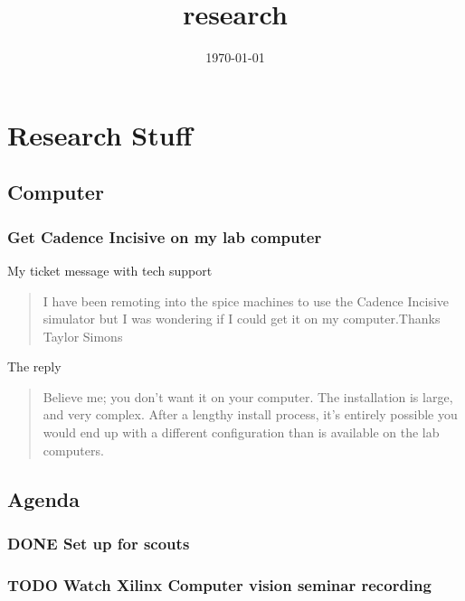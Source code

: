\documentclass[11pt]{article}
\date{\today}
\title{research}
\begin{document}
\maketitle
\tableofcontents

\section{Research Stuff}
\label{sec-1}
\subsection{Computer}
\label{sec-1-1}
\subsubsection{Get Cadence Incisive on my lab computer}
\label{sec-1-1-1}
My ticket message with tech support
\begin{quote}
I have been remoting into the spice machines to use the Cadence Incisive simulator but I was wondering if I could get it on my computer.
​
​Thanks 
​Taylor Simons
\end{quote}

The reply
\begin{quote}
Believe me; you don't want it on your computer. The installation is large, and very complex. After a lengthy install process, it's entirely possible you would end up with a different configuration than is available on the lab computers. 
\end{quote}
\subsection{Agenda}
\label{sec-1-2}
\subsubsection{{\bfseries\sffamily DONE} Set up for scouts}
\label{sec-1-2-1}
\subsubsection{{\bfseries\sffamily TODO} Watch Xilinx Computer vision seminar recording}
\label{sec-1-2-2}
\end{document}
